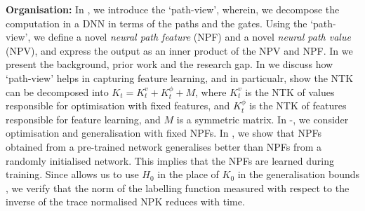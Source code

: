 \textbf{Organisation:} In , we introduce the `path-view', wherein, we decompose the computation in a DNN in terms of the paths and the gates. Using the `path-view', we define a novel \emph{neural path feature} (NPF) and a novel \emph{neural path value} (NPV), and express the output as an inner product of the NPV and NPF. In  we present the background, prior work and the research gap. In  we  discuss how `path-view' helps in capturing feature learning, and in particualr, show the NTK can be decomposed into $K_t=K^v_t+K^{\phi}_t+M$, where $K^v_t$ is the NTK of values responsible for optimisation with fixed features, and $K^{\phi}_t$ is the NTK of features responsible for feature learning, and $M$ is a symmetric matrix. 
In -, we consider optimisation and generalisation with fixed NPFs. In ,  we show that NPFs obtained from a pre-trained network generalises better than NPFs from a randomly initialised network. This implies that the NPFs are learned during training. Since  allows us to use $H_0$ in the place of $K_0$ in the generalisation bounds \cite{cao2019generalization}, we verify that the norm of the labelling function measured with respect to the inverse of the trace normalised NPK reduces with time.\\
\begin{comment}\textbf{Lesson Learnt:} The `path-view' enables us to model and study the dynamics of the gates, and hence the learning of NPFs. Based on the theory and experiments, we can say that \emph{``understanding deep learning requires understanding the dynamics of the gates".}\end{comment}
\begin{comment}
\textbf{Lesson Learnt:} Gradient is a first-order information, and learning with GD is essentially a process of integration, and naturally its outcome is a zeroth-order term. It turns out that splitting this zeroth-order term into NPFs and NPVs is quite useful, in particular, this enables us to identify the role of NPFs. \emph{Understanding deep learning requires understanding the dynamics of the gates.}
\end{comment}
